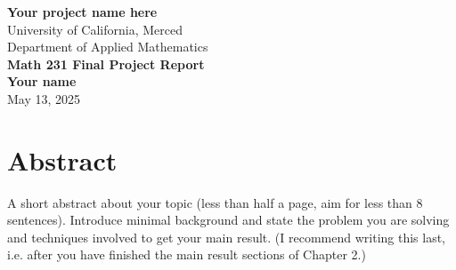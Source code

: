 \documentclass[12pt]{report}
\date{}
\begin{document}
\begin{titlepage}
	\centering
	\vspace*{\fill}
	{\bf \LARGE Your project name here\\}
	\vspace{1cm}
	{\Large University of California, Merced\\}
	\vspace{0.5cm}
	{\large Department of Applied Mathematics\\}
	\vspace{1.5cm}
	{\bf \Large Math 231 Final Project Report\\}
	\vspace{1.5cm}
	{\bf \Large Your name\\}
	\vspace{2cm}
	{\large May 13, 2025\\}
	\vspace*{\fill}
\end{titlepage}

\clearpage
\setcounter{page}{1}
\renewcommand{\thepage}{\roman{page}}

%

\chapter*{Abstract}

A short abstract about your topic (less than half a page, aim for less than 8 sentences). Introduce minimal background and state the problem you are solving and techniques involved to get your main result. (I recommend writing this last, i.e. after you have finished the main result sections of Chapter 2.)

\tableofcontents
{}
\newpage
\listoffigures
{}
\newpage
\listoftables
{}
\newpage
\renewcommand{\thepage}{\arabic{page}}
\setcounter{page}{1}
\end{document}
